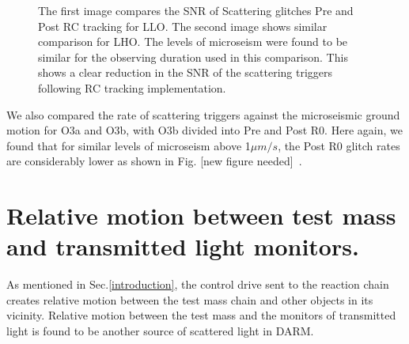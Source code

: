 \documentclass[12pt]{iopart}
\begin{document}
\begin{figure}[h]
    
    
    \caption{The first image compares the SNR of Scattering glitches Pre and Post RC tracking for LLO. The second image shows similar comparison for LHO. The levels of microseism were found to be similar for the observing duration used in this comparison. This shows a clear reduction in the SNR of the scattering triggers following RC tracking implementation. } %
    \label{fig:postr0_scat}
    
\end{figure}
We also compared the rate of scattering triggers against the microseismic ground motion for O3a and O3b, with O3b divided into Pre and Post R0. Here again, we found that for similar levels of microseism above 1${\mu}m/s$, the Post R0 glitch rates are considerably lower as shown in Fig. [new figure needed]~\cite{alog_corey}.


\section{Relative motion between test mass and transmitted light monitors.} \label{transmon_scattering}
As mentioned in Sec.\ref{introduction}, the control drive sent to the reaction chain creates relative motion between the test mass chain and other objects in its vicinity. Relative motion between the test mass and the monitors of transmitted light is found to be another source of scattered light in DARM.
\par
\end{document}
